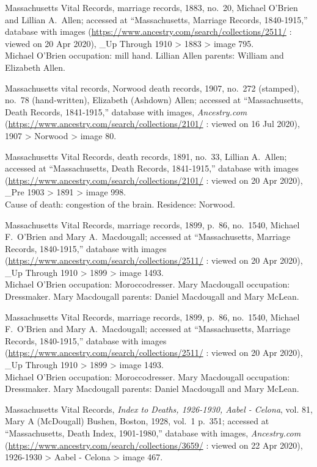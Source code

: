 \begin{thebibliography}{999}
Massachusetts Vital Records, marriage records, 1883, no.\ 20, Michael O'Brien and Lillian A.\ Allen; accessed at ``Massachusetts, Marriage Records, 1840-1915,'' database with images (\url{https://www.ancestry.com/search/collections/2511/} : viewed on 20 Apr 2020), \_Up Through 1910 > 1883 > image 795.\\
Michael O'Brien occupation: mill hand. Lillian Allen parents: William and Elizabeth Allen.

Massachusetts vital records, Norwood death records, 1907, no.\ 272 (stamped), no.\ 78 (hand-written), Elizabeth (Ashdown) Allen; accessed at ``Massachusetts, Death Records, 1841-1915,'' database with images, \textit{Ancestry.com} (\url{https://www.ancestry.com/search/collections/2101/} : viewed on 16 Jul 2020), 1907 > Norwood > image 80.

Massachusetts Vital Records, death records, 1891, no.\ 33, Lillian A.\ Allen; accessed at ``Massachusetts, Death Records, 1841-1915,'' database with images (\url{https://www.ancestry.com/search/collections/2101/} : viewed on 20 Apr 2020), \_Pre 1903 > 1891 > image 998.\\
Cause of death: congestion of the brain. Residence: Norwood.

Massachusetts Vital Records, marriage records, 1899, p.\ 86, no.\ 1540, Michael F.\ O'Brien and Mary A.\ Macdougall; accessed at ``Massachusetts, Marriage Records, 1840-1915,'' database with images (\url{https://www.ancestry.com/search/collections/2511/} : viewed on 20 Apr 2020), \_Up Through 1910 > 1899 > image 1493.\\
Michael O'Brien occupation: Moroccodresser. Mary Macdougall occupation: Dressmaker. Mary Macdougall parents: Daniel Macdougall and Mary McLean.

Massachusetts Vital Records, marriage records, 1899, p.\ 86, no.\ 1540, Michael F.\ O'Brien and Mary A.\ Macdougall; accessed at ``Massachusetts, Marriage Records, 1840-1915,'' database with images (\url{https://www.ancestry.com/search/collections/2511/} : viewed on 20 Apr 2020), \_Up Through 1910 > 1899 > image 1493.\\
Michael O'Brien occupation: Moroccodresser. Mary Macdougall occupation: Dressmaker. Mary Macdougall parents: Daniel Macdougall and Mary McLean.

Massachusetts Vital Records, \textit{Index to Deaths, 1926-1930, Aabel - Celona}, vol. 81, Mary A (McDougall) Bushen, Boston, 1928, vol.\ 1 p.\ 351; accessed at ``Massachusetts, Death Index, 1901-1980,'' database with images, \textit{Ancestry.com} (\url{https://www.ancestry.com/search/collections/3659/} : viewed on 22 Apr 2020), 1926-1930 > Aabel - Celona > image 467.


\end{thebibliography}
